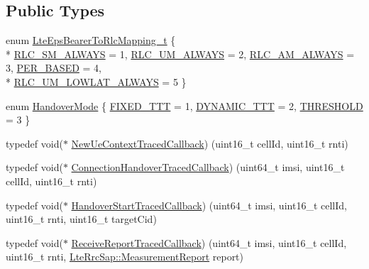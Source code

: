\subsection*{Public Types}
\begin{DoxyCompactItemize}
\item 
enum \hyperlink{classns3_1_1LteEnbRrc_a1c748bf2d69860b866dfda2a38427842}{Lte\+Eps\+Bearer\+To\+Rlc\+Mapping\+\_\+t} \{ \\*
\hyperlink{classns3_1_1LteEnbRrc_a1c748bf2d69860b866dfda2a38427842aacda149c15c085eb654d411b64f62770}{R\+L\+C\+\_\+\+S\+M\+\_\+\+A\+L\+W\+A\+YS} = 1, 
\hyperlink{classns3_1_1LteEnbRrc_a1c748bf2d69860b866dfda2a38427842acde4cbe52f3092f0b832b8c540329332}{R\+L\+C\+\_\+\+U\+M\+\_\+\+A\+L\+W\+A\+YS} = 2, 
\hyperlink{classns3_1_1LteEnbRrc_a1c748bf2d69860b866dfda2a38427842a3cdf85c3ca2f87b1775fde37d95d0ace}{R\+L\+C\+\_\+\+A\+M\+\_\+\+A\+L\+W\+A\+YS} = 3, 
\hyperlink{classns3_1_1LteEnbRrc_a1c748bf2d69860b866dfda2a38427842ab60559f90df74ae5b1e2ba5d7dad3c90}{P\+E\+R\+\_\+\+B\+A\+S\+ED} = 4, 
\\*
\hyperlink{classns3_1_1LteEnbRrc_a1c748bf2d69860b866dfda2a38427842a57f0cbeb7cbaf285166a276e0572c8f4}{R\+L\+C\+\_\+\+U\+M\+\_\+\+L\+O\+W\+L\+A\+T\+\_\+\+A\+L\+W\+A\+YS} = 5
 \}
\item 
enum \hyperlink{classns3_1_1LteEnbRrc_a92c80910218354db2ad7ac531f896c94}{Handover\+Mode} \{ \hyperlink{classns3_1_1LteEnbRrc_a92c80910218354db2ad7ac531f896c94a6981655eb0cd4438cb9d5903d9b04e1a}{F\+I\+X\+E\+D\+\_\+\+T\+TT} = 1, 
\hyperlink{classns3_1_1LteEnbRrc_a92c80910218354db2ad7ac531f896c94a8cdb66e30f4eab71f699079471fbf40f}{D\+Y\+N\+A\+M\+I\+C\+\_\+\+T\+TT} = 2, 
\hyperlink{classns3_1_1LteEnbRrc_a92c80910218354db2ad7ac531f896c94adf9f2c22d2fbf5ed241d6dcf5ecccd3a}{T\+H\+R\+E\+S\+H\+O\+LD} = 3
 \}
\item 
typedef void($\ast$ \hyperlink{classns3_1_1LteEnbRrc_a1a99baa2e7e6091dd884c24a08607678}{New\+Ue\+Context\+Traced\+Callback}) (uint16\+\_\+t cell\+Id, uint16\+\_\+t rnti)
\item 
typedef void($\ast$ \hyperlink{classns3_1_1LteEnbRrc_abeec1875442c11cb7c91ac7c73377921}{Connection\+Handover\+Traced\+Callback}) (uint64\+\_\+t imsi, uint16\+\_\+t cell\+Id, uint16\+\_\+t rnti)
\item 
typedef void($\ast$ \hyperlink{classns3_1_1LteEnbRrc_a6857590923144d9b2212eec0c81826c4}{Handover\+Start\+Traced\+Callback}) (uint64\+\_\+t imsi, uint16\+\_\+t cell\+Id, uint16\+\_\+t rnti, uint16\+\_\+t target\+Cid)
\item 
typedef void($\ast$ \hyperlink{classns3_1_1LteEnbRrc_a606ffef2d69bfc524b80fbec1082c59e}{Receive\+Report\+Traced\+Callback}) (uint64\+\_\+t imsi, uint16\+\_\+t cell\+Id, uint16\+\_\+t rnti, \hyperlink{structns3_1_1LteRrcSap_1_1MeasurementReport}{Lte\+Rrc\+Sap\+::\+Measurement\+Report} report)

\end{DoxyCompactItemize}
